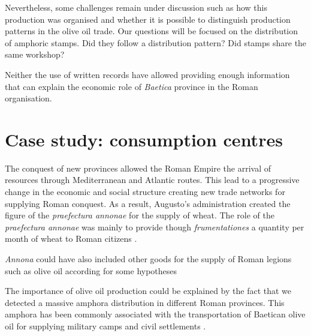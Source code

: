 \documentclass[review]{elsarticle}
\begin{document}
Nevertheless, some challenges remain under discussion such as how this production was organised and whether it is possible to distinguish production patterns in the olive oil trade. Our questions will be focused on the distribution of amphoric stamps. Did they follow a distribution pattern? Did stamps share the same workshop? 

Neither the use of written records have allowed providing enough information that can explain the economic role of \textit{Baetica} province in the Roman organisation.  
  



\section{Case study: consumption centres}

The conquest of new provinces allowed the Roman Empire the arrival of resources through Mediterranean and Atlantic routes. This lead to a progressive change in the economic and social structure creating new trade networks for supplying Roman conquest. As a result, Augusto's administration created the figure of the \textit{praefectura annonae} for the supply of wheat. The role of the \textit{praefectura annonae} was mainly to provide though \textit{frumentationes} a quantity per month of wheat to Roman citizens \citep{remesal_annona_1986,remesal_concierto}. 

\textit{Annona} could have also included other goods for the supply of Roman legions such as olive oil according for some hypotheses \citep{remesal_annona_1986,remesal_annona_1990}

The importance of olive oil production could be explained by the fact that we detected a massive amphora distribution in different Roman provinces. This amphora has been commonly associated with the  transportation of Baetican olive oil for supplying military camps and civil settlements \citep{berni_millet_epigrafianforica_2008}. 
\end{document}
